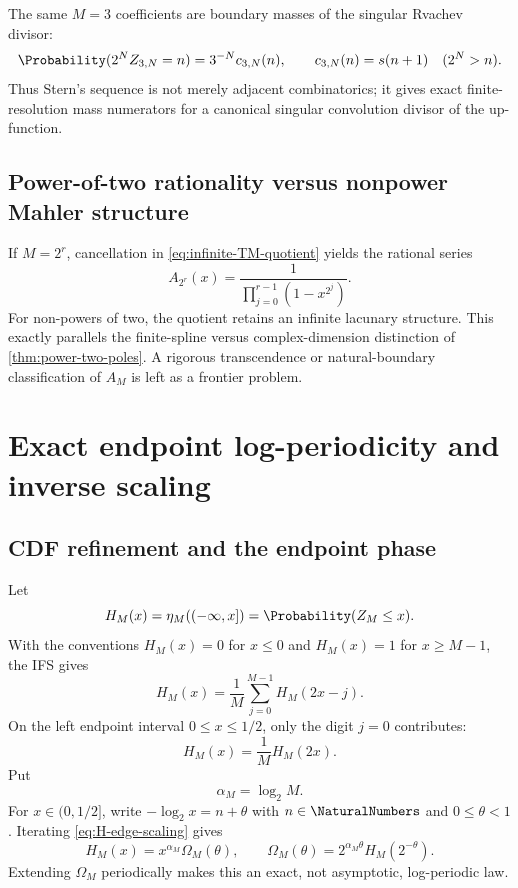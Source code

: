 \documentclass[11pt,oneside]{article}
\theoremstyle{definition}
\theoremstyle{remark}
\begin{document}
The same $M=3$ coefficients are boundary masses of the singular Rvachev divisor:
\begin{equation}
 \Probability(2^NZ_{3,N}=n)=3^{-N}c_{3,N}(n),
 \qquad
 c_{3,N}(n)=s(n+1)\quad(2^N>n).
 \label{eq:Stern-masses}
\end{equation}
Thus Stern's sequence is not merely adjacent combinatorics; it gives exact finite-resolution
mass numerators for a canonical singular convolution divisor of the up-function.

\subsection{Power-of-two rationality versus nonpower Mahler structure}

If $M=2^r$, cancellation in \eqref{eq:infinite-TM-quotient} yields the rational series
\begin{equation}
 A_{2^r}(x)=\frac1{\prod_{j=0}^{r-1}(1-x^{2^j})}.
 \label{eq:A-power-two}
\end{equation}
For non-powers of two, the quotient retains an infinite lacunary structure.  This exactly
parallels the finite-spline versus complex-dimension distinction of
\cref{thm:power-two-poles}.  A rigorous transcendence or natural-boundary classification of
$A_M$ is left as a frontier problem.

\section{Exact endpoint log-periodicity and inverse scaling}
\label{sec:endpoint}

\subsection{CDF refinement and the endpoint phase}

Let
\begin{equation}
 H_M(x)=\eta_M(( -\infty,x])=\Probability(Z_M\le x).
 \label{eq:HM}
\end{equation}
With the conventions $H_M(x)=0$ for $x\le0$ and $H_M(x)=1$ for $x\ge M-1$, the IFS
gives
\begin{equation}
 H_M(x)=\frac1M\sum_{j=0}^{M-1}H_M(2x-j).
 \label{eq:H-refinement}
\end{equation}
On the left endpoint interval $0\le x\le1/2$, only the digit $j=0$ contributes:
\begin{equation}
 H_M(x)=\frac1M H_M(2x).
 \label{eq:H-edge-scaling}
\end{equation}
Put
\begin{equation}
 \alpha_M=\log_2M.
 \label{eq:alphaM}
\end{equation}
For $x\in(0,1/2]$, write
$-\log_2x=n+\theta$ with $n\in\NaturalNumbers$ and $0\le\theta<1$.  Iterating
\eqref{eq:H-edge-scaling} gives
\begin{equation}
 H_M(x)=x^{\alpha_M}\Omega_M(\theta),
 \qquad
 \Omega_M(\theta)=2^{\alpha_M\theta}H_M(2^{-\theta}).
 \label{eq:H-log-periodic}
\end{equation}
Extending $\Omega_M$ periodically makes this an exact, not asymptotic, log-periodic law.
\end{document}
